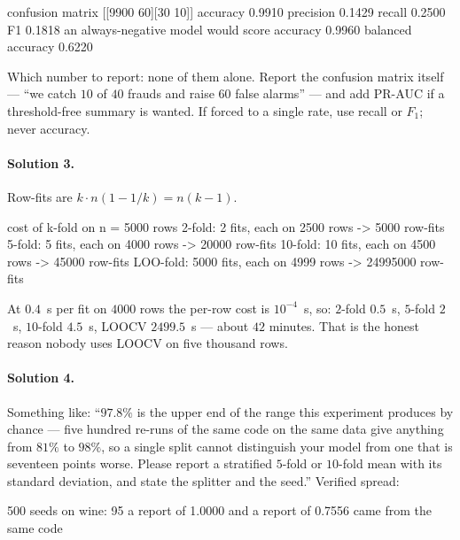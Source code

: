 \documentclass[11pt]{article}
\begin{document}
\begin{codeout}
   confusion matrix [[9900 60][30 10]]
   accuracy 0.9910  precision 0.1429  recall 0.2500  F1 0.1818
   an always-negative model would score accuracy 0.9960
   balanced accuracy 0.6220
\end{codeout}

Which number to report: none of them alone. Report the confusion matrix itself
--- ``we catch $10$ of $40$ frauds and raise $60$ false alarms'' --- and add
PR-AUC if a threshold-free summary is wanted. If forced to a single rate, use
recall or $F_1$; never accuracy.

\paragraph{Solution 3.} Row-fits are $k \cdot n(1 - 1/k) = n(k-1)$.

\begin{codeout}
cost of k-fold on n = 5000 rows
       2-fold:     2 fits, each on 2500 rows ->      5000 row-fits
       5-fold:     5 fits, each on 4000 rows ->     20000 row-fits
      10-fold:    10 fits, each on 4500 rows ->     45000 row-fits
     LOO-fold:  5000 fits, each on 4999 rows ->  24995000 row-fits
\end{codeout}

At $0.4$~s per fit on $4000$ rows the per-row cost is $10^{-4}$~s, so: $2$-fold
$0.5$~s, $5$-fold $2$~s, $10$-fold $4.5$~s, LOOCV $2499.5$~s --- about $42$
minutes. That is the honest reason nobody uses LOOCV on five thousand rows.

\paragraph{Solution 4.} Something like: ``$97.8\%$ is the upper end of the
range this experiment produces by chance --- five hundred re-runs of the same
code on the same data give anything from $81\%$ to $98\%$, so a single split
cannot distinguish your model from one that is seventeen points worse. Please
report a stratified $5$-fold or $10$-fold mean with its standard deviation,
and state the splitter and the seed.'' Verified spread:

\begin{codeout}
   500 seeds on wine: 95%
   a report of 1.0000 and a report of 0.7556 came from the same code
\end{codeout}
\end{document}

